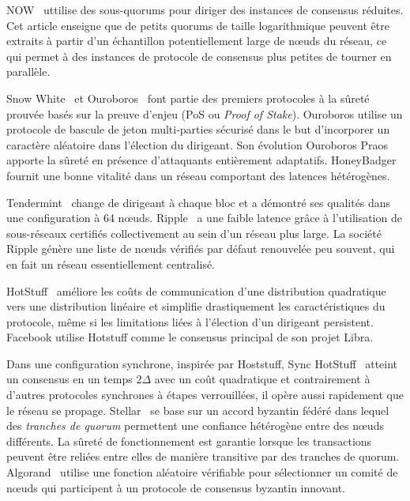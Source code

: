 {NOW~\cite{guerraoui2013highly} uttilise des sous-quorums pour diriger des ins\-tances de consensus réduites.
Cet article enseigne que de petits quorums de taille logarithmique peuvent être extraits à partir d'un
échantillon potentiellement large de nœuds du réseau, ce qui permet à des instances de protocole de consensus plus
petites de tourner en parallèle.

Snow White~\cite{cryptoeprint:2016:919} et Ouroboros~\cite{KiayiasRDO17} font partie des premiers protocoles à la
sûreté prouvée basés sur la preuve d'enjeu (PoS ou \emph{Proof of Stake}). Ouroboros utilise un protocole de
bascule de jeton multi-parties sécurisé dans le but d'incorporer un caractère aléatoire dans l'élection du dirigeant.
Son évolution Ouroboros Praos~\cite{DavidGKR18} apporte la sûreté en présence d'attaquants entièrement adaptatifs.
HoneyBadger~\cite{MillerXCSS16} fournit une bonne vitalité dans un réseau comportant des latences hétérogènes.

Tendermint~\cite{buchman2016tendermint, 1807.04938} change de dirigeant à chaque bloc et a démontré ses qualités dans une
configuration à 64 nœuds. Ripple~\cite{schwartz2014ripple} a une faible latence grâce à l'utilisation de sous-réseaux
certifiés collectivement au sein d'un réseau plus large. La société Ripple génère une liste de nœuds vérifiés par
défaut renouvelée peu souvent, qui en fait un réseau essentiellement centralisé.

HotStuff~\cite{hotstuff,hotstuffpodc} améliore les coûts de communication d'une distribution quadratique vers une
distribution linéaire et simplifie drastiquement les caractéristiques du protocole, même si les limitations liées
à l'élection d'un dirigeant persistent. Facebook utilise Hotstuff comme le consensus principal de son projet Libra.

Dans une configuration synchrone, inspirée par Hoststuff, Sync HotStuff~\cite{synchotstuff} atteint un consensus en
un temps $2\Delta$ avec un coût quadratique et contrairement à d'autres protocoles synchrones à étapes verrouillées, il
opère aussi rapidement que le réseau se propage. Stellar~\cite{mazieres2015stellar} se base sur un accord byzantin
fédéré dans lequel des \emph{tranches de quorum} permettent une confiance hétérogène entre des nœuds différents. La
sûreté de fonctionnement est garantie lorsque les transactions peuvent être reliées entre elles de manière transitive
par des tranches de quorum. Algorand~\cite{GiladHMVZ17} utilise une fonction aléatoire vérifiable pour sélectionner un
comité de nœuds qui participent à un protocole de consensus byzantin innovant.

}
